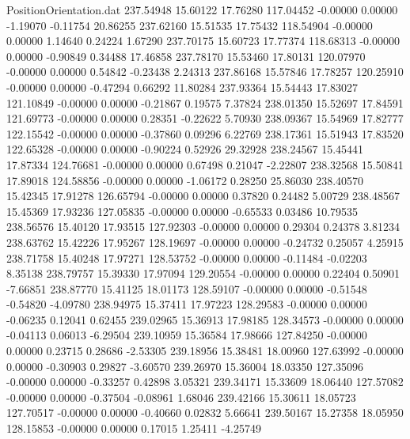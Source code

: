 \begin{filecontents}{PositionOrientation.dat}
 237.54948   15.60122   17.76280   117.04452   -0.00000    0.00000   -1.19070   -0.11754   20.86255
 237.62160   15.51535   17.75432   118.54904   -0.00000    0.00000    1.14640    0.24224    1.67290
 237.70175   15.60723   17.77374   118.68313   -0.00000    0.00000   -0.90849    0.34488   17.46858
 237.78170   15.53460   17.80131   120.07970   -0.00000    0.00000    0.54842   -0.23438    2.24313
 237.86168   15.57846   17.78257   120.25910   -0.00000    0.00000   -0.47294    0.66292   11.80284
 237.93364   15.54443   17.83027   121.10849   -0.00000    0.00000   -0.21867    0.19575    7.37824
 238.01350   15.52697   17.84591   121.69773   -0.00000    0.00000    0.28351   -0.22622    5.70930
 238.09367   15.54969   17.82777   122.15542   -0.00000    0.00000   -0.37860    0.09296    6.22769
 238.17361   15.51943   17.83520   122.65328   -0.00000    0.00000   -0.90224    0.52926   29.32928
 238.24567   15.45441   17.87334   124.76681   -0.00000    0.00000    0.67498    0.21047   -2.22807
 238.32568   15.50841   17.89018   124.58856   -0.00000    0.00000   -1.06172    0.28250   25.86030
 238.40570   15.42345   17.91278   126.65794   -0.00000    0.00000    0.37820    0.24482    5.00729
 238.48567   15.45369   17.93236   127.05835   -0.00000    0.00000   -0.65533    0.03486   10.79535
 238.56576   15.40120   17.93515   127.92303   -0.00000    0.00000    0.29304    0.24378    3.81234
 238.63762   15.42226   17.95267   128.19697   -0.00000    0.00000   -0.24732    0.25057    4.25915
 238.71758   15.40248   17.97271   128.53752   -0.00000    0.00000   -0.11484   -0.02203    8.35138
 238.79757   15.39330   17.97094   129.20554   -0.00000    0.00000    0.22404    0.50901   -7.66851
 238.87770   15.41125   18.01173   128.59107   -0.00000    0.00000   -0.51548   -0.54820   -4.09780
 238.94975   15.37411   17.97223   128.29583   -0.00000    0.00000   -0.06235    0.12041    0.62455
 239.02965   15.36913   17.98185   128.34573   -0.00000    0.00000   -0.04113    0.06013   -6.29504
 239.10959   15.36584   17.98666   127.84250   -0.00000    0.00000    0.23715    0.28686   -2.53305
 239.18956   15.38481   18.00960   127.63992   -0.00000    0.00000   -0.30903    0.29827   -3.60570
 239.26970   15.36004   18.03350   127.35096   -0.00000    0.00000   -0.33257    0.42898    3.05321
 239.34171   15.33609   18.06440   127.57082   -0.00000    0.00000   -0.37504   -0.08961    1.68046
 239.42166   15.30611   18.05723   127.70517   -0.00000    0.00000   -0.40660    0.02832    5.66641
 239.50167   15.27358   18.05950   128.15853   -0.00000    0.00000    0.17015    1.25411   -4.25749

\end{filecontents}
